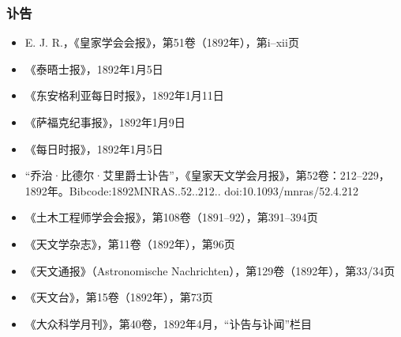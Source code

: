 \subsubsection{讣告}
\begin{itemize}
\item E. J. R.，《皇家学会会报》，第51卷（1892年），第i–xii页
\item 《泰晤士报》，1892年1月5日
\item 《东安格利亚每日时报》，1892年1月11日
\item 《萨福克纪事报》，1892年1月9日
\item 《每日时报》，1892年1月5日
\item “乔治·比德尔·艾里爵士讣告”，《皇家天文学会月报》，第52卷：212–229，1892年。Bibcode:1892MNRAS..52..212.. doi:10.1093/mnras/52.4.212
\item 《土木工程师学会会报》，第108卷（1891–92），第391–394页
\item 《天文学杂志》，第11卷（1892年），第96页
\item 《天文通报》（Astronomische Nachrichten），第129卷（1892年），第33/34页
\item 《天文台》，第15卷（1892年），第73页
\item 《大众科学月刊》，第40卷，1892年4月，“讣告与讣闻”栏目
\end{itemize}
